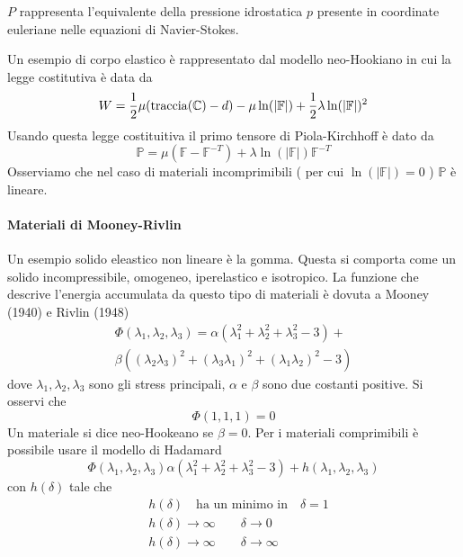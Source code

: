 $P$ rappresenta l'equivalente della pressione idrostatica $p$ presente in coordinate euleriane nelle equazioni di Navier-Stokes.

Un esempio di corpo elastico è rappresentato dal modello neo-Hookiano in cui la legge costitutiva è data da
\begin{equation*}
W = \frac{1}{2}\mu(\operatorname{traccia}(\mathbb{C})-d)-\mu\ln(\vert\mathbb{F}\vert)+\frac{1}{2}\lambda\ln(\vert\mathbb{F}\vert)^2
\end{equation*}
Usando questa legge costituitiva il primo tensore di Piola-Kirchhoff è dato da
\begin{equation*}
\mathbb{P} = \mu(\mathbb{F}-\mathbb{F}^{-T})+\lambda\ln(\vert\mathbb{F}\vert)\mathbb{F}^{-T}
\end{equation*}
Osserviamo che nel caso di materiali incomprimibili ( per cui $\ln(\vert\mathbb{F}\vert)=0$ ) $\mathbb{P}$ è lineare.
%

\paragraph{Materiali di Mooney-Rivlin}
Un esempio solido eleastico non lineare è la gomma. Questa si comporta come un solido incompressibile, omogeneo, iperelastico e isotropico.
La funzione che descrive l'energia accumulata da questo tipo di materiali è dovuta a Mooney (1940) e Rivlin (1948)
\begin{multline*}
\Phi(\lambda_1,\lambda_2,\lambda_3) = \alpha(\lambda_1^2+\lambda_2^2+\lambda_3^2-3) + \\ \beta((\lambda_2\lambda_3)^2+(\lambda_3\lambda_1)^2+(\lambda_1\lambda_2)^2 -3)
\end{multline*}
dove $\lambda_1,\lambda_2,\lambda_3$ sono gli stress principali, $\alpha$ e $\beta$ sono due costanti positive. 
Si osservi che 
\begin{equation*}
\Phi(1,1,1) = 0
\end{equation*}
Un materiale si dice neo-Hookeano se $\beta=0$.
Per i materiali comprimibili è possibile usare il modello di Hadamard
\begin{equation*}
\Phi(\lambda_1,\lambda_2,\lambda_3)\alpha(\lambda_1^2+\lambda_2^2+\lambda_3^2-3) + h(\lambda_1,\lambda_2,\lambda_3)
\end{equation*}
con $h(\delta)$ tale che
\begin{align*}
&h(\delta) \quad\text{ha un minimo in}\quad\delta=1 \\
&h(\delta)\to\infty\qquad\delta\to 0\\
&h(\delta)\to\infty\qquad\delta\to\infty\\
\end{align*}

